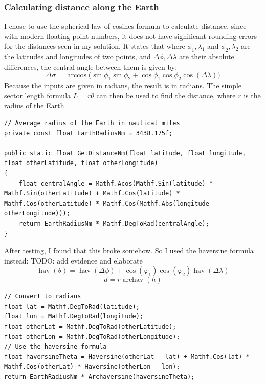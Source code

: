 \documentclass{article}
\begin{document}
\subsubsection{Calculating distance along the Earth}
I chose to use the spherical law of cosines formula to calculate distance, since with modern floating point numbers, it does not have significant rounding errors for the distances seen in my solution.
It states that where $\phi _{1}, \lambda _{1}$ and $\phi _{2}, \lambda _{2}$ are the latitudes and longitudes of two points, and ${\Delta \phi, \Delta \lambda}$ are their absolute differences, the central angle between them is given by:
\[ \Delta \sigma =\arccos {\bigl (}\sin \phi _{1}\sin \phi _{2}+\cos \phi _{1}\cos \phi _{2}\cos(\Delta \lambda ){\bigr )} \] 
Because the inputs are given in radians, the result is in radians.
The simple sector length formula $L=r\theta$ can then be used to find the distance, where $r$ is the radius of the Earth\cite{greatcircledistance}.
\lstset{style=csharp}
\begin{lstlisting}[label={lst:getdistancenm},caption=Calculating great-circle distance using the spherical law of cosines]
// Average radius of the Earth in nautical miles
private const float EarthRadiusNm = 3438.175f;

public static float GetDistanceNm(float latitude, float longitude, float otherLatitude, float otherLongitude)
{
    float centralAngle = Mathf.Acos(Mathf.Sin(latitude) * Mathf.Sin(otherLatitude) + Mathf.Cos(latitude) * Mathf.Cos(otherLatitude) * Mathf.Cos(Mathf.Abs(longitude - otherLongitude)));
    return EarthRadiusNm * Mathf.DegToRad(centralAngle);
}
\end{lstlisting}

After testing, I found that this broke somehow.
So I used the haversine formula instead:
TODO: add evidence and elaborate
\[ \operatorname{hav}(\theta ) = \operatorname{hav} (\Delta \phi) + \cos(\varphi _{1})\cos (\varphi _{2})\operatorname{hav}(\Delta \lambda) \] 
\[ d = r \operatorname{archav} (h) \]

\begin{lstlisting}[label={lst:getdistancenmhaversine},caption=Calculating great-circle distance using the haversine formula]
// Convert to radians
float lat = Mathf.DegToRad(latitude);
float lon = Mathf.DegToRad(longitude);
float otherLat = Mathf.DegToRad(otherLatitude);
float otherLon = Mathf.DegToRad(otherLongitude);
// Use the haversine formula
float haversineTheta = Haversine(otherLat - lat) + Mathf.Cos(lat) * Mathf.Cos(otherLat) * Haversine(otherLon - lon);
return EarthRadiusNm * Archaversine(haversineTheta);
\end{lstlisting}
\end{document}
